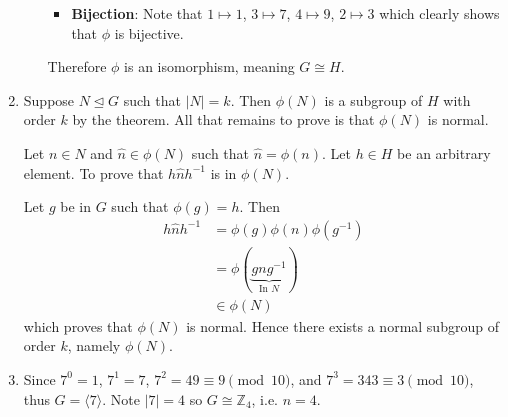 \begin{enumerate}
\begin{enumerate}[label=(\roman*)]
\begin{itemize}
            \item \textbf{Bijection}: Note that $1 \mapsto 1$, $3 \mapsto 7$, $4 \mapsto 9$, $2 \mapsto 3$ which clearly shows that $\phi$ is bijective.
        \end{itemize}
        Therefore $\phi$ is an isomorphism, meaning $G \cong H$.
    \end{enumerate}

    \item Suppose $N \unlhd G$ such that $|N| = k$. Then $\phi(N)$ is a subgroup of $H$ with order $k$ by the theorem. All that remains to prove is that $\phi(N)$ is normal.

    Let $n \in N$ and $\hat{n} \in \phi(N)$ such that $\hat{n} = \phi(n)$. Let $h \in H$ be an arbitrary element. To prove that $h\hat{n}h^{-1}$ is in $\phi(N)$.

    Let $g$ be in $G$ such that $\phi(g) = h$. Then
    \begin{align*}
        h\hat{n}h^{-1} &= \phi(g)\phi(n)\phi(g^{-1})\\
        &= \phi(\underbrace{gng^{-1}}_{\text{In } N})\\
        &\in \phi(N)
    \end{align*}
    which proves that $\phi(N)$ is normal. Hence there exists a normal subgroup of order $k$, namely $\phi(N)$.

    \item Since $7^0 = 1$, $7^1 = 7$, $7^2 = 49 \equiv 9 \pmod{10}$, and $7^3 = 343 \equiv 3 \pmod{10}$, thus $G = \langle 7 \rangle$. Note $|7| = 4$ so $G \cong \mathbb{Z}_4$, i.e. $n = 4$.
\end{enumerate}


